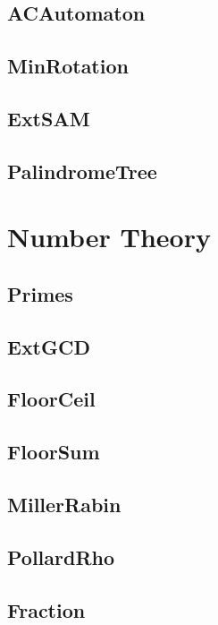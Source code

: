 	\subsection{ACAutomaton}
	
	\subsection{MinRotation}
	
	\subsection{ExtSAM}
	
	\subsection{PalindromeTree}
	
\section{Number Theory}
	\subsection{Primes}
	
	\subsection{ExtGCD}
	
	\subsection{FloorCeil}
	
	\subsection{FloorSum}
	
	
	\subsection{MillerRabin}
	
	\subsection{PollardRho}
	
	\subsection{Fraction}
	

